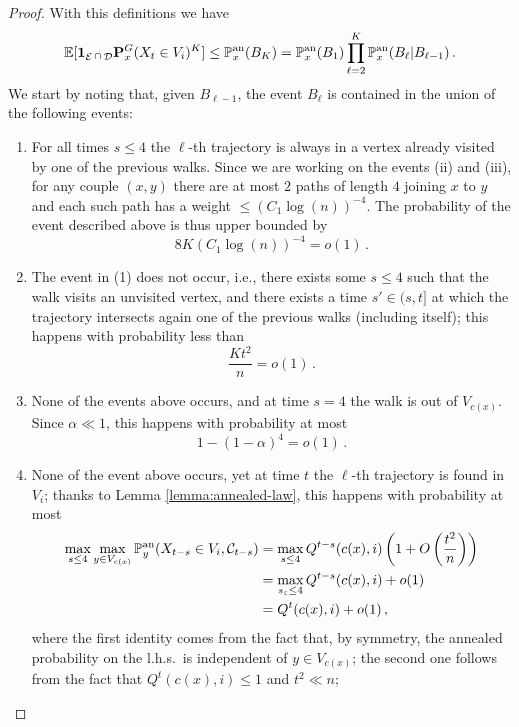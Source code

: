 \documentclass[11pt,oneside]{amsart}
\numberwithin{equation}{section}  %
\theoremstyle{plain}
\newcommand{\lhs}{{l.h.s.~}}
\newcommand{\eps}{\varepsilon}
\DeclareMathOperator{\cD}{\mathcal{D}}
\DeclareMathOperator{\cE}{\mathcal{E}}
\newcommand{\E}{\mathbb{E}}
\newcommand{\p}{\mathbb{P}}
\newcommand{\one}{\textup{\textbf{1}}}
\newcommand{\quenchG}{\mathbf{P}^G}
\newcommand{\pan}{\p^{\textup{an}}}
\newcommand{\semi}{{Q}}
\newcommand{\s}{{s_\eps}}
\begin{document}
\begin{proof}
			With this definitions we have
			\begin{equation}
			\E[\one_{\cE\cap\cD}\quenchG_x(X_t\in V_i)^K] \le \pan_x(B_K)=\pan_x(B_1)\prod_{{\ell}=2}^{K} \pan_x( B_{{\ell}}| B_{{\ell}-1})\,.
			\end{equation}
			We start by noting that, given $B_{{\ell}-1}$, the event $B_{{\ell}}$ is contained in the union of the following events:
			\begin{enumerate}
				\item[(1)] For all times $s\le 4$ the $\ell$-th trajectory is always in a vertex already visited by one of the previous walks.
                Since we are working on the events (ii) and (iii), for any couple $(x,y)$ there are at most $2$ paths of length $4$ joining $x$ to $y$ and each such path has a weight $\le (C_1\log(n))^{-4}$. The probability of the event described above is thus upper bounded by
        $$8K(C_1\log(n))^{-4}=o(1)\,.$$
				\item[(2)] The event in (1) does not occur, i.e., there exists some $s\le 4$ such that the walk visits an unvisited vertex, and there exists a time $s'\in(s,t]$ at which the trajectory intersects again one of the previous walks (including itself); this happens with probability less than 
                $$\frac{Kt^2}{n}=o(1)\,.$$
                \item[(3)] None of the events above occurs, and at time $s=4$ the walk is out of $V_{c(x)}$.  
                Since  $\alpha\ll 1$, this happens with probability at most
                $$1-(1-\alpha)^4=o(1)\,.$$
				\item[(4)] None of the event above occurs, yet at time $t$ the $\ell$-th trajectory is found in $V_i$; thanks to Lemma \ref{lemma:annealed-law}, this happens with probability at most
				\begin{align*}
					\max_{s\le 4}\max_{y\in V_{c(x)}}\pan_y(X_{t-s}\in V_i,\mathcal{C}_{t-s})&=\max_{s\le 4}\semi^{t-s}(c(x),i)\left(1+O\left(\frac{t^2}n\right)\right)\\
				&=\max_{\s\le 4}\semi^{t-s}(c(x),i)+o(1)\\
					&=\semi^{t}(c(x),i)+o(1)\,,
				\end{align*}
                where the first identity comes from the fact that, by symmetry, the annealed probability on the \lhs is independent of $y\in V_{c(x)}$; the second one follows from the fact that $\semi^t(c(x),i)\le 1$ and $t^2\ll n$;

\end{enumerate}
\end{proof}
\end{document}
